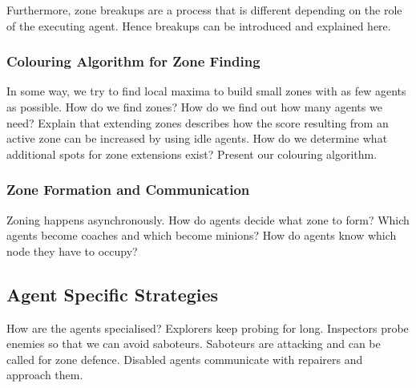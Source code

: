Furthermore, zone breakups are a process that is different depending on the role of the executing agent. Hence breakups can be introduced and explained here.

\subsubsection{Colouring Algorithm for Zone Finding}\label{alg:zon_colouring}
In some way, we try to find local maxima to build small zones with as few agents as possible. How do we find zones? How do we find out how many agents we need? Explain that extending zones describes how the score resulting from an active zone can be increased by using idle agents. How do we determine what additional spots for zone extensions exist?
Present our colouring algorithm.

\subsubsection{Zone Formation and Communication}\label{alg:zon_formation}
Zoning happens asynchronously.
How do agents decide what zone to form? Which agents become coaches and which become minions? How do agents know which node they have to occupy?

\subsection{Agent Specific Strategies}
How are the agents specialised? Explorers keep probing for long. Inspectors probe enemies so that we can avoid saboteurs. Saboteurs are attacking and can be called for zone defence. Disabled agents communicate with repairers and approach them.
